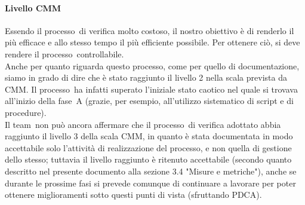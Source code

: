 \documentclass[../PianoDiQualifica.tex]{subfiles}
\begin{document}
\begin{appendices}
			\paragraph{Livello CMM}
			Essendo il processo\g\ di verifica molto costoso, il nostro obiettivo è di renderlo il più efficace e allo stesso tempo il più efficiente possibile. Per ottenere ciò, si deve rendere il processo\g\ 
controllabile. \\
			Anche per quanto riguarda questo processo\g, come per quello di documentazione, siamo in grado di dire che è stato raggiunto il livello 2 nella scala prevista da CMM\g. Il processo\g\ ha infatti superato l'iniziale stato caotico nel quale si trovava all'inizio della fase\g\ A (grazie, per esempio, all'utilizzo sistematico di script e di procedure). \\
			Il team\g\ non può ancora affermare che il processo\g\ di verifica adottato abbia raggiunto il livello 3 della scala CMM\g, in quanto è stata documentata in modo accettabile solo l'attività di realizzazione del processo\g, e non quella di gestione dello stesso; tuttavia il livello raggiunto è ritenuto accettabile (secondo quanto descritto nel presente documento alla sezione 3.4 "Misure e metriche"), anche se durante le prossime fasi si prevede comunque di continuare a lavorare per poter ottenere miglioramenti sotto questi punti di vista (sfruttando PDCA\g).
\end{appendices}
\end{document}
